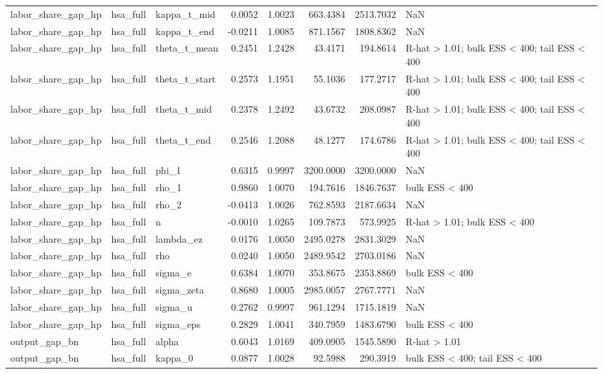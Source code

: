 \begin{tabular}{lllrrrrl}
labor\_share\_gap\_hp & hsa\_full & kappa\_t\_mid & 0.0052 & 1.0023 & 663.4384 & 2513.7032 & NaN \\
labor\_share\_gap\_hp & hsa\_full & kappa\_t\_end & -0.0211 & 1.0085 & 871.1567 & 1808.8362 & NaN \\
labor\_share\_gap\_hp & hsa\_full & theta\_t\_mean & 0.2451 & 1.2428 & 43.4171 & 194.8614 & R-hat > 1.01; bulk ESS < 400; tail ESS < 400 \\
labor\_share\_gap\_hp & hsa\_full & theta\_t\_start & 0.2573 & 1.1951 & 55.1036 & 177.2717 & R-hat > 1.01; bulk ESS < 400; tail ESS < 400 \\
labor\_share\_gap\_hp & hsa\_full & theta\_t\_mid & 0.2378 & 1.2492 & 43.6732 & 208.0987 & R-hat > 1.01; bulk ESS < 400; tail ESS < 400 \\
labor\_share\_gap\_hp & hsa\_full & theta\_t\_end & 0.2546 & 1.2088 & 48.1277 & 174.6786 & R-hat > 1.01; bulk ESS < 400; tail ESS < 400 \\
labor\_share\_gap\_hp & hsa\_full & phi\_1 & 0.6315 & 0.9997 & 3200.0000 & 3200.0000 & NaN \\
labor\_share\_gap\_hp & hsa\_full & rho\_1 & 0.9860 & 1.0070 & 194.7616 & 1846.7637 & bulk ESS < 400 \\
labor\_share\_gap\_hp & hsa\_full & rho\_2 & -0.0413 & 1.0026 & 762.8593 & 2187.6634 & NaN \\
labor\_share\_gap\_hp & hsa\_full & n & -0.0010 & 1.0265 & 109.7873 & 573.9925 & R-hat > 1.01; bulk ESS < 400 \\
labor\_share\_gap\_hp & hsa\_full & lambda\_ez & 0.0176 & 1.0050 & 2495.0278 & 2831.3029 & NaN \\
labor\_share\_gap\_hp & hsa\_full & rho & 0.0240 & 1.0050 & 2489.9542 & 2703.0186 & NaN \\
labor\_share\_gap\_hp & hsa\_full & sigma\_e & 0.6384 & 1.0070 & 353.8675 & 2353.8869 & bulk ESS < 400 \\
labor\_share\_gap\_hp & hsa\_full & sigma\_zeta & 0.8680 & 1.0005 & 2985.0057 & 2767.7771 & NaN \\
labor\_share\_gap\_hp & hsa\_full & sigma\_u & 0.2762 & 0.9997 & 961.1294 & 1715.1819 & NaN \\
labor\_share\_gap\_hp & hsa\_full & sigma\_eps & 0.2829 & 1.0041 & 340.7959 & 1483.6790 & bulk ESS < 400 \\
output\_gap\_bn & hsa\_full & alpha & 0.6043 & 1.0169 & 409.0905 & 1545.5890 & R-hat > 1.01 \\
output\_gap\_bn & hsa\_full & kappa\_0 & 0.0877 & 1.0028 & 92.5988 & 290.3919 & bulk ESS < 400; tail ESS < 400 \\

\end{tabular}

